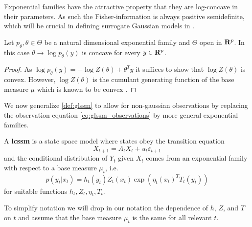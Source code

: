 \begin{definition}

\end{definition}
    
Exponential families have the attractive property that they are log-concave in their parameters. As such the Fisher-information is always positive semidefinite, which will be crucial in defining surrogate Gaussian models in .
\begin{lemma}
    Let $p_{\theta}, \theta \in \Theta$ be a natural dimensional exponential family and $\Theta$ open in $\mathbf R^{p}$. In this case $\theta \to \log p_{\theta}(y)$ is concave for every $y \in \mathbf R^{p}$.
\end{lemma}

\begin{proof}
    As $\log p_{\theta}(y) = - \log Z(\theta) + \theta^{T} y$ it suffices to show that $\log Z(\theta)$ is convex. However, $\log Z(\theta)$ is the cumulant generating function of the base measure $\mu$ which is known to be convex .
\end{proof}

We now generalize \cref{def:glssm} to allow for non-gaussian observations by replacing the observation equation \cref{eq:glssm_observations} by more general exponential families.

\begin{definition}
    A \textbf{\gls{lcssm}} is a state space model where states obey the transition equation 
    $$
    X_{t + 1} = A_{t}X_{t} + u_{t}\varepsilon_{t + 1}
    $$
    and the conditional distribution of $Y_{t}$ given $X_{t}$ comes from an exponential family with respect to a base measure $\mu_{t}$, i.e.
    $$
    p (y_{t}|x_{t}) = h_{t}(y_{t}) Z_{t}(x_{t}) \exp \left( \eta_{t}(x_{t})^{T} T_{t}(y_{t}) \right)
    $$
    for suitable functions $h_{t}, Z_{t}, \eta_{t}, T_{t}$. 

\end{definition}

\begin{remark}
    To simplify notation we will drop in our notation the dependence of $h$, $Z$, and $T$ on $t$ and assume that the base measure $\mu_t$ is the same for all relevant $t$.
\end{remark}



